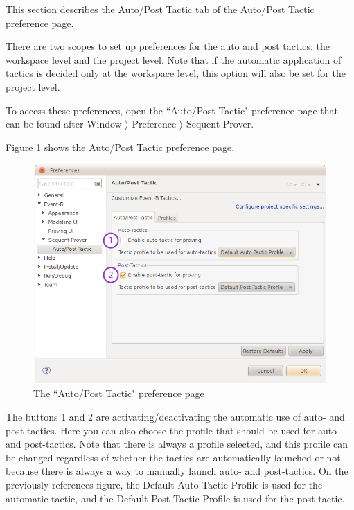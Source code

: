 This section describes the \textsf{Auto/Post Tactic} tab of the \textsf{Auto/Post Tactic} preference page.

There are two scopes to set up preferences for the auto and post tactics: the workspace level and the project level. Note that if the automatic application of tactics is decided only at the workspace level, this option will also be set for the project level.

To access these preferences, open the ``Auto/Post Tactic" preference page that can be found after \textsf{Window $\rangle$ Preference $\rangle$ Sequent Prover}.

Figure \ref{fig_ref_01_preferences7} shows the \textsf{Auto/Post Tactic} preference page.

\begin{figure}[!ht]
\begin{center}
	\includegraphics{img/reference/ref_01_preferences7.png}
	\caption{The ``Auto/Post Tactic" preference page}
	\label{fig_ref_01_preferences7}
\end{center}
\end{figure}

The buttons 1 and 2 are activating/deactivating the automatic use of auto- and post-tactics. Here you can also choose the profile that should be used for auto- and post-tactics. Note that there is always a profile selected, and this profile can be changed regardless of whether the tactics are automatically launched or not because there is always a way to manually launch auto- and post-tactics. On the previously references figure, the \textsf{Default Auto Tactic Profile} is used for the automatic tactic, and the \textsf{Default Post Tactic Profile} is used for the post-tactic.

